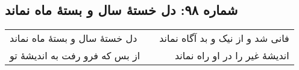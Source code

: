 \begin{center}
\section*{شماره ۹۸: دل خستۀ سال و بستۀ ماه نماند}
\label{sec:098}
\begin{longtable}{l p{0.5cm} r}
دل خستهٔ سال و بستهٔ ماه نماند
&&
فانی شد و از نیک و بد آگاه نماند
\\
از بس که فرو رفت به اندیشهٔ تو
&&
اندیشهٔ غیر را در او راه نماند
\\
\end{longtable}
\end{center}

